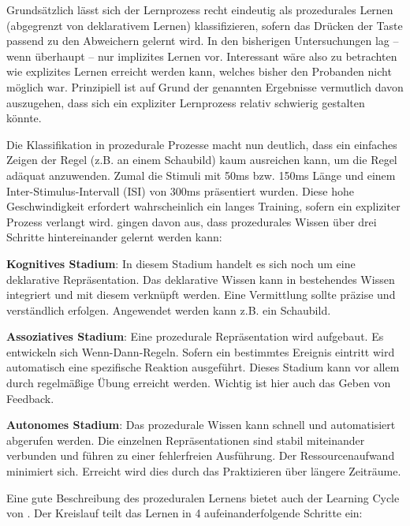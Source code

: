 \documentclass[doc,a4paper,12pt]{apa6}
\begin{document}
Grundsätzlich lässt sich der Lernprozess recht eindeutig als prozedurales Lernen (abgegrenzt von deklarativem Lernen) klassifizieren, sofern das Drücken der Taste passend zu den Abweichern gelernt wird. In den bisherigen Untersuchungen lag – wenn überhaupt – nur implizites Lernen vor. Interessant wäre also zu betrachten wie explizites Lernen erreicht werden kann, welches bisher den Probanden nicht möglich war. Prinzipiell ist auf Grund der genannten Ergebnisse vermutlich davon auszugehen, dass sich ein expliziter Lernprozess relativ schwierig gestalten könnte.

Die Klassifikation in prozedurale Prozesse macht nun deutlich, dass ein einfaches Zeigen der Regel (z.B. an einem Schaubild) kaum ausreichen kann, um die Regel adäquat anzuwenden. Zumal die Stimuli mit 50ms bzw. 150ms Länge und einem Inter-Stimulus-Intervall (ISI) von 300ms präsentiert wurden. Diese hohe Geschwindigkeit erfordert wahrscheinlich ein langes Training, sofern ein expliziter Prozess verlangt wird. \textcite{fitts1967human} gingen davon aus, dass prozedurales Wissen über drei Schritte hintereinander gelernt werden kann:

\begin{compactenum}
  \item \textbf{Kognitives Stadium}: In diesem Stadium handelt es sich noch um eine deklarative Repräsentation. Das deklarative Wissen kann in bestehendes Wissen integriert und mit diesem verknüpft werden. Eine Vermittlung sollte präzise und verständlich erfolgen. Angewendet werden kann z.B. ein Schaubild.
  \item \textbf{Assoziatives Stadium}: Eine prozedurale Repräsentation wird aufgebaut. Es entwickeln sich Wenn-Dann-Regeln. Sofern ein bestimmtes Ereignis eintritt wird automatisch eine spezifische Reaktion ausgeführt. Dieses Stadium kann vor allem durch regelmäßige Übung erreicht werden. Wichtig ist hier auch das Geben von Feedback.
  \item \textbf{Autonomes Stadium}: Das prozedurale Wissen kann schnell und automatisiert abgerufen werden. Die einzelnen Repräsentationen sind stabil miteinander verbunden und führen zu einer fehlerfreien Ausführung. Der Ressourcenaufwand minimiert sich. Erreicht wird dies durch das Praktizieren über längere Zeiträume.
\end{compactenum}

Eine gute Beschreibung des prozeduralen Lernens bietet auch der Learning Cycle von \textcite{whitmore2009coaching}. Der Kreislauf teilt das Lernen in 4 aufeinanderfolgende Schritte ein:
\end{document}
